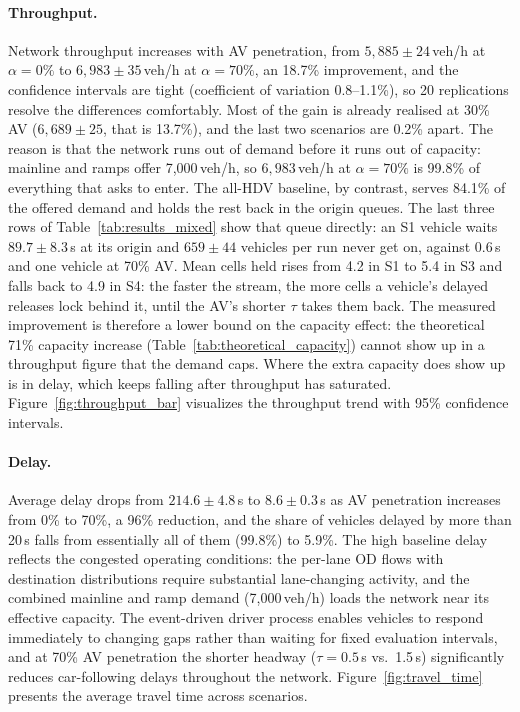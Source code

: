 \documentclass[review,authoryear]{elsarticle}
\begin{document}
\paragraph{Throughput.} Network throughput increases with AV penetration, from $5{,}885 \pm 24$\,veh/h at $\alpha = 0\%$ to $6{,}983 \pm 35$\,veh/h at $\alpha = 70\%$, an 18.7\% improvement, and the confidence intervals are tight (coefficient of variation 0.8--1.1\%), so 20 replications resolve the differences comfortably. Most of the gain is already realised at 30\% AV ($6{,}689 \pm 25$, that is 13.7\%), and the last two scenarios are 0.2\% apart. The reason is that the network runs out of demand before it runs out of capacity: mainline and ramps offer 7{,}000\,veh/h, so $6{,}983$\,veh/h at $\alpha = 70\%$ is 99.8\% of everything that asks to enter. The all-HDV baseline, by contrast, serves 84.1\% of the offered demand and holds the rest back in the origin queues. The last three rows of Table~\ref{tab:results_mixed} show that queue directly: an S1 vehicle waits $89.7 \pm 8.3$\,s at its origin and $659 \pm 44$ vehicles per run never get on, against $0.6$\,s and one vehicle at 70\% AV. Mean cells held rises from 4.2 in S1 to 5.4 in S3 and falls back to 4.9 in S4: the faster the stream, the more cells a vehicle's delayed releases lock behind it, until the AV's shorter $\tau$ takes them back. The measured improvement is therefore a lower bound on the capacity effect: the theoretical 71\% capacity increase (Table~\ref{tab:theoretical_capacity}) cannot show up in a throughput figure that the demand caps. Where the extra capacity does show up is in delay, which keeps falling after throughput has saturated. Figure~\ref{fig:throughput_bar} visualizes the throughput trend with 95\% confidence intervals.

\paragraph{Delay.} Average delay drops from $214.6 \pm 4.8$\,s to $8.6 \pm 0.3$\,s as AV penetration increases from 0\% to 70\%, a 96\% reduction, and the share of vehicles delayed by more than 20\,s falls from essentially all of them (99.8\%) to 5.9\%. The high baseline delay reflects the congested operating conditions: the per-lane OD flows with destination distributions require substantial lane-changing activity, and the combined mainline and ramp demand (7{,}000\,veh/h) loads the network near its effective capacity. The event-driven driver process enables vehicles to respond immediately to changing gaps rather than waiting for fixed evaluation intervals, and at 70\% AV penetration the shorter headway ($\tau = 0.5$\,s vs.\ 1.5\,s) significantly reduces car-following delays throughout the network. Figure~\ref{fig:travel_time} presents the average travel time across scenarios.
\end{document}
